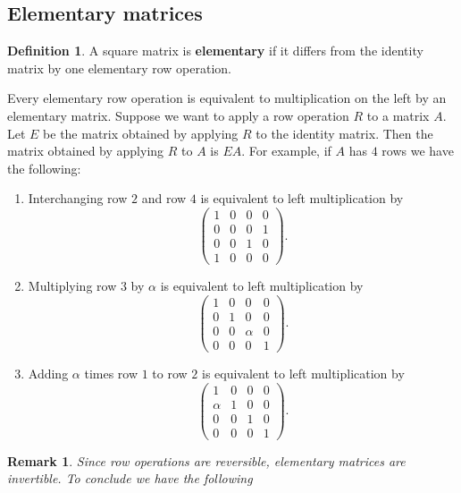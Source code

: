 \documentclass[12pt, a4paper]{article}
\newtheorem*{remark}{Remark}
\theoremstyle{definition}
\newtheorem{definition}{Definition}[section]
\theoremstyle{plain}
\begin{document}
\subsection{Elementary matrices}

\begin{definition} A square matrix is \textbf{elementary} if it differs from the identity matrix by one elementary row operation. \end{definition}

Every elementary row operation is equivalent to multiplication on the left by an elementary matrix. Suppose we want to apply a row operation $R$ to a matrix $A$. Let $E$ be the matrix obtained by applying $R$ to the identity matrix. Then the matrix obtained by applying $R$ to $A$ is $EA.$ For example, if $A$ has $4$ rows we have the following:

\begin{enumerate}
	
	\item Interchanging row $2$ and row $4$ is equivalent to left multiplication by 
	$$\begin{pmatrix} 
	1&0&0&0 \\
	0&0&0&1 \\
	0&0&1&0 \\
	1&0&0&0
	\end{pmatrix}.$$

	\item Multiplying row $3$ by $\alpha$ is equivalent to left multiplication by 
	$$\begin{pmatrix} 
	1&0&0&0 \\
	0&1&0&0 \\
	0&0&\alpha&0 \\
	0&0&0&1
	\end{pmatrix}.$$

	\item Adding $\alpha$ times row $1$ to row $2$ is equivalent to left multiplication by 
	$$\begin{pmatrix} 
	1&0&0&0 \\
	\alpha&1&0&0 \\
	0&0&1&0 \\
	0&0&0&1
	\end{pmatrix}.$$

\end{enumerate}

\begin{remark}
Since row operations are reversible, elementary matrices are invertible. To conclude we have the following 
\end{remark}
\end{document}

